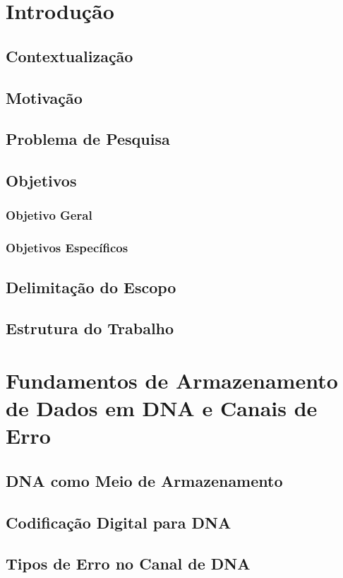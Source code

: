 \chapter{Introdução}

\section{Contextualização}
\section{Motivação}
\section{Problema de Pesquisa}
\section{Objetivos}
\subsection{Objetivo Geral}
\subsection{Objetivos Específicos}
\section{Delimitação do Escopo}
\section{Estrutura do Trabalho}

\chapter{Fundamentos de Armazenamento de Dados em DNA e Canais de Erro}

\section{DNA como Meio de Armazenamento}
\section{Codificação Digital para DNA}
\section{Tipos de Erro no Canal de DNA}

